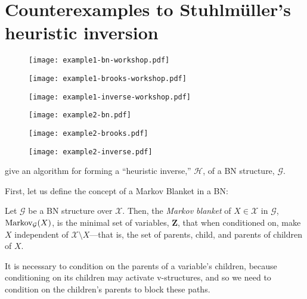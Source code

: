 \documentclass{article}
\begin{document}
\section{Counterexamples to Stuhlm\"{u}ller's heuristic inversion}
\begin{figure*}[t]
    \centering
		\begin{subfigure}[b]{0.16\textwidth}
				\centering
        \texttt{[image: example1-bn-workshop.pdf]}
        \caption{}
        \label{fig:example1-bn}
    \end{subfigure}
    \begin{subfigure}[b]{0.16\textwidth}
				\centering
        \texttt{[image: example1-brooks-workshop.pdf]}
        \caption{}
        \label{fig:example1-brooks}
    \end{subfigure}
    \begin{subfigure}[b]{0.16\textwidth}
				\centering
        \texttt{[image: example1-inverse-workshop.pdf]}
        \caption{}
        \label{fig:example1-inverse}
    \end{subfigure}
		\begin{subfigure}[b]{0.16\textwidth}
				\centering
        \texttt{[image: example2-bn.pdf]}
        \caption{}
        \label{fig:example2-bn}
    \end{subfigure}
    \begin{subfigure}[b]{0.16\textwidth}
				\centering
        \texttt{[image: example2-brooks.pdf]}
        \caption{}
        \label{fig:example2-inverse}
    \end{subfigure}
		\begin{subfigure}[b]{0.16\textwidth}
				\centering
        \texttt{[image: example2-inverse.pdf]}
        \caption{}
        \label{fig:example2-inverse}
    \end{subfigure}
    \caption[Counterexamples]{(a,d) Two simple BN structures for a generative model, (b,e) The corresponding inverse BN structures formed by Stuhlm{\"u}ller's Algorithm, (c,f) The inverse BN structure formed by our algorithm.
    This demonstrates how Stuhlm{\"u}ller's Algorithm can miss many edges and longer-term dependencies.}
    \label{fig:bn-examples}
\end{figure*}

\citet{StuhlmullerEtAl2013} give an algorithm for forming a ``heuristic inverse,'' $\mathcal{H}$, of a BN structure, $\mathcal{G}$.

First, let us define the concept of a Markov Blanket in a BN:
\begin{definition}
Let $\mathcal{G}$ be a BN structure over $\mathcal{X}$.
Then, the \emph{Markov blanket} of $X\in\mathcal{X}$ in $\mathcal{G}$, $\textnormal{Markov}_\mathcal{G}(X)$, is the minimal set of variables, $\mathbf{Z}$, that when conditioned on, make $X$ independent of $\mathcal{X}\setminus X$---that is, the set of parents, child, and parents of children of $X$.
\end{definition}
It is necessary to condition on the parents of a variable's children, because conditioning on its children may activate v-structures, and so we need to condition on the children's parents to block these paths.
\end{document}
